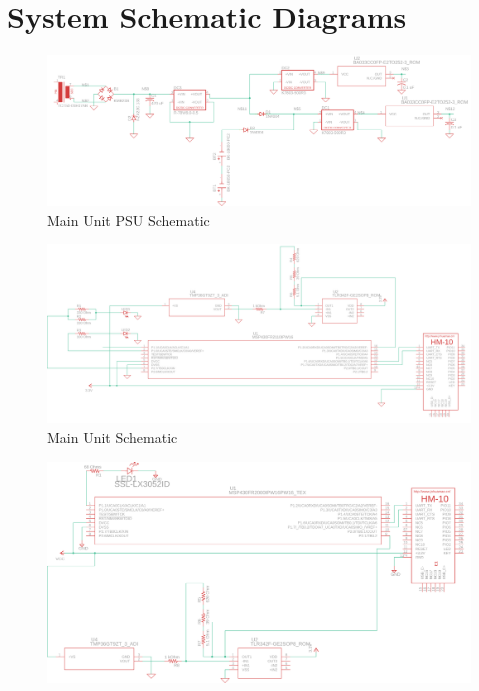 \section{System Schematic Diagrams}
\begin{landscape}
  \begin{center}
  \begin{figure}[H]
    \includegraphics[width=1.6\textwidth, left]{../Power-Supply/Main Unit PSU/main-unit-psu.png}
    \caption{Main Unit PSU Schematic}
    \label{fig:main-psu-schematic}
  \end{figure}
  \end{center}
  \begin{center}
  \begin{figure}[H]
    \includegraphics[width=\pdfpagewidth]{../Main-Unit/Figures/main-unit.png}
    \caption{Main Unit Schematic}
    \label{fig:main-unit-schematic}
  \end{figure}
  \end{center}
  \begin{center}
  \begin{figure}[H]
    \includegraphics[width=\pdfpagewidth]{../Sub-Unit/Figures/sub-unit.png}

\end{figure}
\end{center}
\end{landscape}
